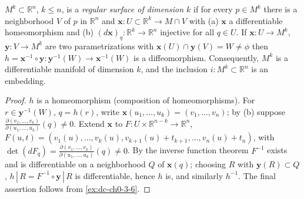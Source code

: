 \begin{example}
  \label{ex:dc-ch0-4-2}


  $M^k\subset\mathbb{R}^n$, $k\le n$, is a \emph{regular surface of dimension $k$} if for
  every $p\in M^k$ there is a neighborhood $V$ of $p$ in $\mathbb{R}^n$ and
  $\mathbf{x}:U\subset\mathbb{R}^k\to M\cap V$ with (a) $\mathbf{x}$ a
  differentiable homeomorphism and (b) $(d\mathbf{x})_q:\mathbb{R}^k\to\mathbb{R}^n$
  injective for all $q\in U$. If
  $\mathbf{x}:U\to M^k$, $\mathbf{y}:V\to M^k$ are two parametrizations with
  $\mathbf{x}(U)\cap\mathbf{y}(V)=W\neq\phi$ then
  $h=\mathbf{x}^{-1}\circ\mathbf{y}:\mathbf{y}^{-1}(W)\to\mathbf{x}^{-1}(W)$ is a
  diffeomorphism. Consequently, $M^k$ is a differentiable manifold of dimension
  $k$, and the inclusion $i:M^k\subset\mathbb{R}^n$ is an embedding.
\end{example}
\begin{proof}
  \sketch
  $h$ is a homeomorphism (composition of homeomorphisms). For
  $r\in\mathbf{y}^{-1}(W)$, $q=h(r)$, write
  $\mathbf{x}(u_1,\dots,u_k)=(v_1,\dots,v_n)$; by (b) suppose
  $\frac{\partial(v_1,\dots,v_k)}{\partial(u_1,\dots,u_k)}(q)\neq0$. Extend
  $\mathbf{x}$ to $F:U\times\mathbb{R}^{n-k}\to\mathbb{R}^n$,
  $F(u,t)=(v_1(u),\dots,v_k(u),v_{k+1}(u)+t_{k+1},\dots,v_n(u)+t_n)$, with
  $\det(dF_q)=\frac{\partial(v_1,\dots,v_k)}{\partial(u_1,\dots,u_k)}(q)\neq0$. By
  the inverse function theorem $F^{-1}$ exists and is differentiable on a
  neighborhood $Q$ of $\mathbf{x}(q)$; choosing $R$ with $\mathbf{y}(R)\subset Q$,
  $h\,|\,R=F^{-1}\circ\mathbf{y}\,|\,R$ is differentiable, hence $h$ is, and
  similarly $h^{-1}$. The final assertion follows from
  \cref{ex:dc-ch0-3-6}.
\end{proof}

